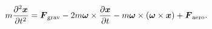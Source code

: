 \documentclass[10pt]{article}
\begin{document}
\begin{align*}m \frac { { \partial  }^{ 2 } {\boldsymbol x} }{ \partial { t }^{ 2 } } = 
{\boldsymbol F}_{\rm grav} 
- 2m{ \boldsymbol \omega }\times \frac { { \partial  } {\boldsymbol x} }{ \partial { t } } 
- m {\boldsymbol  \omega  }\times \left( { \boldsymbol \omega  }\times { \boldsymbol x } \right) 
+ {\boldsymbol F}_{\rm aero}.\end{align*}
\end{document}
